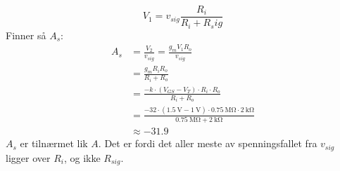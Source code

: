 \documentclass[a4paper,11pt,norsk]{article}
\begin{document}
\begin{enumerate}
\[            V_1 = v_{sig}\frac{R_i}{R_i + R_sig}
        \]
        Finner så $A_s$:
        \begin{align*}
            A_s &= \frac{V_2}{v_{sig}} = \frac{g_m V_1 R_o}{v_{sig}} \\
                &= \frac{g_m R_i R_o}{R_i + R_o} \\
                &= \frac{-k \cdot (V_{GS} - V_T) \cdot R_i \cdot R_o}{R_i + R_o} \\
                &= \frac{-32 \cdot (\SI{1.5}{\volt} - \SI{1}{\volt}) \cdot \SI{0.75}{\mega\ohm} \cdot \SI{2}{\kilo\ohm}}{\SI{0.75}{\mega\ohm} + \SI{2}{\kilo\ohm}} \\
                &\approx -31.9 
        \end{align*}
        $A_s$ er tilnærmet lik $A$. Det er fordi det aller meste av spenningsfallet fra $v_{sig}$ ligger over $R_i$, og ikke $R_{sig}$.
\end{enumerate}
\end{document}
